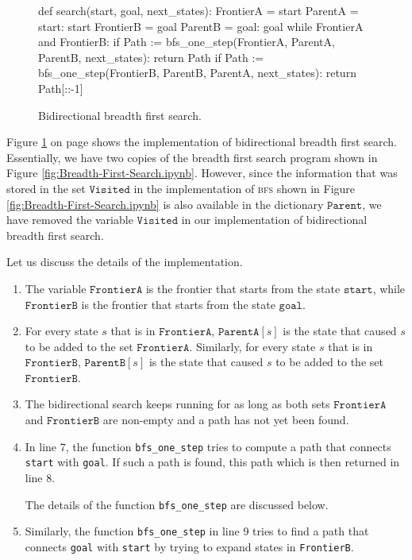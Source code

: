 \begin{figure}[!ht]
\centering
\begin{python3code}
def search(start, goal, next_states):        
    FrontierA = { start }
    ParentA   = { start: start }
    FrontierB = { goal }
    ParentB   = { goal: goal } 
    while FrontierA and FrontierB:
        if Path := bfs_one_step(FrontierA, ParentA, ParentB, next_states):
            return Path
        if Path := bfs_one_step(FrontierB, ParentB, ParentA, next_states):
            return Path[::-1]
\end{python3code}
\vspace*{-0.3cm}
\caption{Bidirectional breadth first search.}
\label{fig:Bidirectional-BFS.ipynb}
\end{figure}

Figure \ref{fig:Bidirectional-BFS.ipynb} on page \pageref{fig:Bidirectional-BFS.ipynb} shows the implementation
of bidirectional breadth first search.  Essentially, we have two copies of the breadth first search program shown in
Figure \ref{fig:Breadth-First-Search.ipynb}.  However, since the information that was stored in the set
$\texttt{Visited}$ in the implementation of \textsc{bfs} shown in Figure \ref{fig:Breadth-First-Search.ipynb} is
also available in the dictionary $\texttt{Parent}$, we have removed the variable $\texttt{Visited}$ in our
implementation of bidirectional breadth first search.

Let us discuss the details of the implementation.
\begin{enumerate}
\item The variable $\texttt{FrontierA}$ is the frontier that starts from the state $\texttt{start}$, while
      $\texttt{FrontierB}$ is the frontier that starts from the state $\texttt{goal}$.
\item For every state $s$ that is in $\texttt{FrontierA}$, $\mathtt{ParentA}[s]$ is the state that caused $s$
      to be added to the set $\texttt{FrontierA}$.  Similarly, for every state $s$ that is in $\texttt{FrontierB}$,
      $\mathtt{ParentB}[s]$ is the state that caused $s$ to be added to the set $\texttt{FrontierB}$.
\item The bidirectional search keeps running for as long as both sets $\texttt{FrontierA}$ and
      $\texttt{FrontierB}$ are non-empty and a path has not yet been found. 
\item In line 7, the function \texttt{bfs\_one\_step} tries to compute a path that connects \texttt{start} with
      \texttt{goal}.  If such a path is found, this path which is then returned in
      line 8. 

      The details of the function \texttt{bfs\_one\_step} are discussed below.
\item Similarly, the function \texttt{bfs\_one\_step} in line 9 tries to find a path that connects \texttt{goal} with
      \texttt{start} by trying to expand states in \texttt{FrontierB}.
\end{enumerate}

